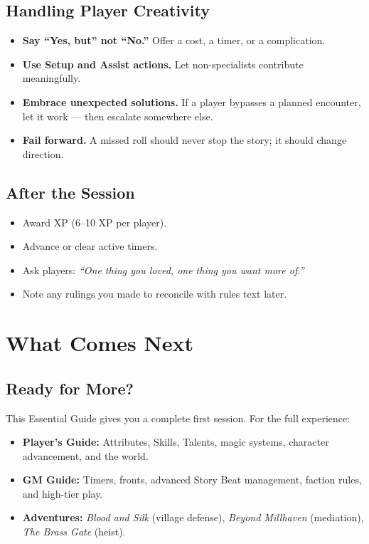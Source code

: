 \documentclass[11pt]{book}
\begin{document}
\section{Handling Player Creativity}

\begin{itemize}
  \item \textbf{Say ``Yes, but'' not ``No.''} Offer a cost, a timer, or a complication.
  \item \textbf{Use Setup and Assist actions.} Let non-specialists contribute meaningfully.
  \item \textbf{Embrace unexpected solutions.} If a player bypasses a planned encounter, let it work --- then escalate somewhere else.
  \item \textbf{Fail forward.} A missed roll should never stop the story; it should change direction.
\end{itemize}

\section{After the Session}

\begin{itemize}
  \item Award XP (6--10 XP per player).
  \item Advance or clear active timers.
  \item Ask players: \textit{``One thing you loved, one thing you want more of.''}
  \item Note any rulings you made to reconcile with rules text later.
\end{itemize}

\clearpage

\chapter{What Comes Next}
\label{ch:next-steps}

\section{Ready for More?}

This Essential Guide gives you a complete first session. For the full experience:

\begin{itemize}
  \item \textbf{Player's Guide:} Attributes, Skills, Talents, magic systems, character advancement, and the world.
  \item \textbf{GM Guide:} Timers, fronts, advanced Story Beat management, faction rules, and high-tier play.
  \item \textbf{Adventures:} \textit{Blood and Silk} (village defense), \textit{Beyond Millhaven} (mediation), \textit{The Brass Gate} (heist).
\end{itemize}
\end{document}
